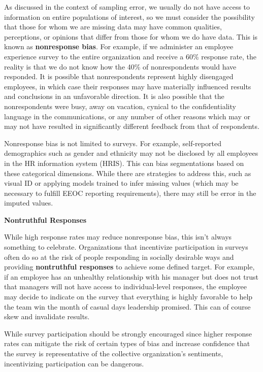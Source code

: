 \documentclass[]{book}
\begin{document}
As discussed in the context of sampling error, we usually do not have access to information on entire populations of interest, so we must consider the possibility that those for whom we are missing data may have common qualities, perceptions, or opinions that differ from those for whom we do have data. This is known as \textbf{nonresponse bias}. For example, if we administer an employee experience survey to the entire organization and receive a 60\% response rate, the reality is that we do not know how the 40\% of nonrespondents would have responded. It is possible that nonrespondents represent highly disengaged employees, in which case their responses may have materially influenced results and conclusions in an unfavorable direction. It is also possible that the nonrespondents were busy, away on vacation, cynical to the confidentiality language in the communications, or any number of other reasons which may or may not have resulted in significantly different feedback from that of respondents.

Nonresponse bias is not limited to surveys. For example, self-reported demographics such as gender and ethnicity may not be disclosed by all employees in the HR information system (HRIS). This can bias segmentations based on these categorical dimensions. While there are strategies to address this, such as visual ID or applying models trained to infer missing values (which may be necessary to fulfill EEOC reporting requirements), there may still be error in the imputed values.

\textbf{Nontruthful Responses}

While high response rates may reduce nonresponse bias, this isn't always something to celebrate. Organizations that incentivize participation in surveys often do so at the risk of people responding in socially desirable ways and providing \textbf{nontruthful responses} to achieve some defined target. For example, if an employee has an unhealthy relationship with his manager but does not trust that managers will not have access to individual-level responses, the employee may decide to indicate on the survey that everything is highly favorable to help the team win the month of casual days leadership promised. This can of course skew and invalidate results.

While survey participation should be strongly encouraged since higher response rates can mitigate the risk of certain types of bias and increase confidence that the survey is representative of the collective organization's sentiments, incentivizing participation can be dangerous.
\end{document}
